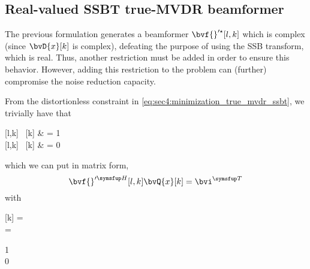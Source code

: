 %
%
\subsection{Real-valued SSBT true-MVDR beamformer}

The previous formulation generates a beamformer $\bvf{}'^\star[l,k]$ which is complex (since $\bvD{x}[k]$ is complex), defeating the purpose of using the SSB transform, which is real. Thus, another restriction must be added in order to ensure this behavior. However, adding this restriction to the problem can (further) compromise the noise reduction capacity.

From the distortionless constraint in \cref{eq:sec4:minimization_true_mvdr_ssbt}, we trivially have that
\begin{subalign}
	[l,k] \,  & = 1 \\
	[l,k] \,  & = 0
\end{subalign}
which we can put in matrix form,
\begin{equation}
	\he{\bvf{}'}[l,k] \bvQ{x}[k] = \tr{\bvi}
\end{equation}
with
\begin{subgather}
	 =  \\
	\bvi =
	\begin{bmatrix}
		1 \\ 0
	\end{bmatrix}
\end{subgather}

